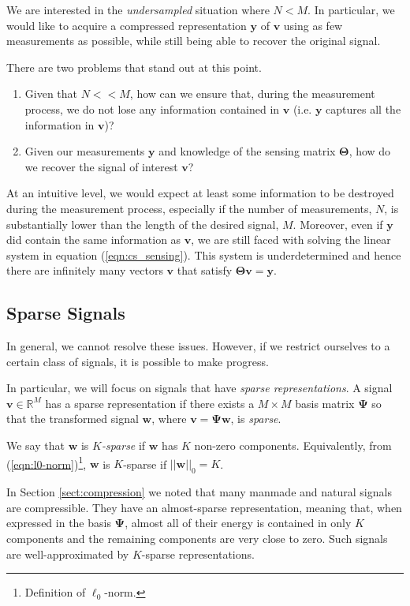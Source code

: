 We are interested in the \emph{undersampled} situation where $N < M$.
In particular, we would like to acquire a compressed representation $\bm y$ of $\bm v$ using as few measurements as possible, while still being able to recover the original signal.

There are two problems that stand out at this point. 
\begin{enumerate}
\item Given that $N << M$, how can we ensure that, during the measurement process, we do not lose any information contained in $\bm v$ (i.e. $\bm y$ captures all the information in $\bm v$)?
\item Given our measurements $\bm y$ and knowledge of the sensing matrix $\bm\Theta$, how do we recover the signal of interest $\bm v$?
\end{enumerate}

At an intuitive level, we would expect at least some information to be destroyed during the measurement process, especially if the number of measurements, $N$, is substantially lower than the length of the desired signal, $M$.
Moreover, even if $\bm y$ did contain the same information as $\bm v$, we are still faced with solving the linear system in equation (\ref{eqn:cs_sensing}).
This system is underdetermined and hence there are infinitely many vectors $\bm v$ that satisfy $\bm\Theta\bm v=\bm y$. 

\subsection{Sparse Signals}
In general, we cannot resolve these issues.
However, if we restrict ourselves to a certain class of signals, it is possible to make progress.

In particular, we will focus on signals that have \emph{sparse representations}.
A signal $\bm v \in\mathbb{R}^M$ has a sparse representation if there exists a $M\times M$ basis matrix $\bm\Psi$ so that the transformed signal $\bm w$, where $\bm v = \bm\Psi\bm w$, is \emph{sparse}.

We say that $\bm w$ is \emph{$K$-sparse} if $\bm w$ has $K$ non-zero components.
Equivalently, from (\ref{eqn:l0-norm})\footnote{Definition of $\ell_0$-norm.}, $\bm w$ is $K$-sparse if $||\bm w||_0 = K$.

In Section \ref{sect:compression} we noted that many manmade and natural signals are compressible.
They have an almost-sparse representation, meaning that, when expressed in the basis $\bm\Psi$, almost all of their energy is contained in only $K$ components and the remaining components are very close to zero.
Such signals are well-approximated by $K$-sparse representations.

